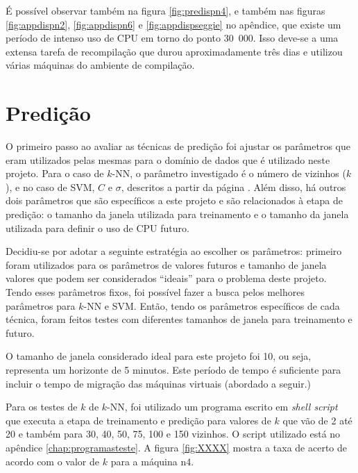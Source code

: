 É possível observar também na figura \ref{fig:predispn4}, e também nas
figuras \ref{fig:appdispn2}, \ref{fig:appdispn6} e \ref{fig:appdispseggie} no
apêndice, que existe um período de intenso uso de CPU em torno do ponto
30~000. Isso deve-se a uma extensa tarefa de recompilação que durou
aproximadamente três dias e utilizou várias máquinas do ambiente de
compilação.

\section{Predição}

O primeiro passo ao avaliar as técnicas de predição foi ajustar os
parâmetros que eram utilizados pelas mesmas para o domínio de dados que é
utilizado neste projeto. Para o caso de $k$-NN, o parâmetro investigado é o
número de vizinhos ($k$), e no caso de SVM, $C$ e $\sigma$, descritos a
partir da página \pageref{sec:margenssuaves}. Além disso, há outros dois
parâmetros que são específicos a este projeto e são relacionados à etapa de
predição: o tamanho da janela utilizada para treinamento e o tamanho da
janela utilizada para definir o uso de CPU futuro.

Decidiu-se por adotar a seguinte estratégia ao escolher os parâmetros:
primeiro foram utilizados para os parâmetros de valores futuros e tamanho
de janela valores que podem ser considerados “ideais” para o problema deste
projeto. Tendo esses parâmetros fixos, foi possível fazer a busca pelos
melhores parâmetros para $k$-NN e SVM. Então, tendo os parâmetros
específicos de cada técnica, foram feitos testes com diferentes tamanhos de
janela para treinamento e futuro.


O tamanho de janela considerado ideal para este projeto foi 10, ou seja,
representa um horizonte de 5 minutos. Este período de tempo é suficiente
para incluir o tempo de migração das máquinas virtuais (abordado a seguir.)

Para os testes de $k$ de $k$-NN, foi utilizado um programa escrito em
\emph{shell script} que executa a etapa de treinamento e predição para
valores de $k$ que vão de 2 até 20 e também para 30, 40, 50, 75, 100 e 150
vizinhos. O script utilizado está no apêndice \ref{chap:programasteste}. A
figura \ref{fig:XXXX} mostra a taxa de acerto de acordo com o valor de $k$
para a máquina n4.

